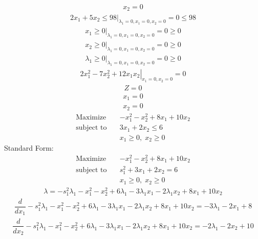 \documentclass{article}
\begin{document}
\begin{align*}
x_{2}=0\end{align*}
\begin{align*}
\left.2x_{1} + 5x_{2}\le98\right|_{\lambda_{1}=0,x_{1}=0,x_{2}=0}=0\le98\end{align*}
\begin{align*}
\left.x_{1}\ge0\right|_{\lambda_{1}=0,x_{1}=0,x_{2}=0}=0\ge0\end{align*}
\begin{align*}
\left.x_{2}\ge0\right|_{\lambda_{1}=0,x_{1}=0,x_{2}=0}=0\ge0\end{align*}
\begin{align*}
\left.\lambda_{1}\ge0\right|_{\lambda_{1}=0,x_{1}=0,x_{2}=0}=0\ge0\end{align*}
\begin{align*}
\left.2x_{1}^{2} - 7x_{2}^{2} + 12x_{1}x_{2}\right|_{x_{1}=0,x_{2}=0}=0\end{align*}
\begin{align*}
Z=0\end{align*}
\begin{align*}
x_{1}=0\end{align*}
\begin{align*}
x_{2}=0\end{align*}
\begin{align*}
\text{Maximize} \quad & -x_{1}^{2} - x_{2}^{2} + 8x_{1} + 10x_{2}\\
\text{subject to} \quad
& 3x_{1} + 2x_{2}\le6\\
& x_{1}\ge0,\; x_{2}\ge0\end{align*}
Standard Form:\\
\begin{align*}
\text{Maximize} \quad & -x_{1}^{2} - x_{2}^{2} + 8x_{1} + 10x_{2}\\
\text{subject to} \quad
& s_{1}^{2} + 3x_{1} + 2x_{2}=6\\
& x_{1}\ge0,\; x_{2}\ge0\end{align*}
\begin{align*}
\lambda=-s_{1}^{2}\lambda_{1} - x_{1}^{2} - x_{2}^{2} + 6\lambda_{1} - 3\lambda_{1}x_{1} - 2\lambda_{1}x_{2} + 8x_{1} + 10x_{2}\end{align*}
\begin{align*}
\dfrac{d}{dx_{1}}-s_{1}^{2}\lambda_{1} - x_{1}^{2} - x_{2}^{2} + 6\lambda_{1} - 3\lambda_{1}x_{1} - 2\lambda_{1}x_{2} + 8x_{1} + 10x_{2}=-3\lambda_{1} - 2x_{1} + 8\end{align*}
\begin{align*}
\dfrac{d}{dx_{2}}-s_{1}^{2}\lambda_{1} - x_{1}^{2} - x_{2}^{2} + 6\lambda_{1} - 3\lambda_{1}x_{1} - 2\lambda_{1}x_{2} + 8x_{1} + 10x_{2}=-2\lambda_{1} - 2x_{2} + 10\end{align*}
\end{document}
